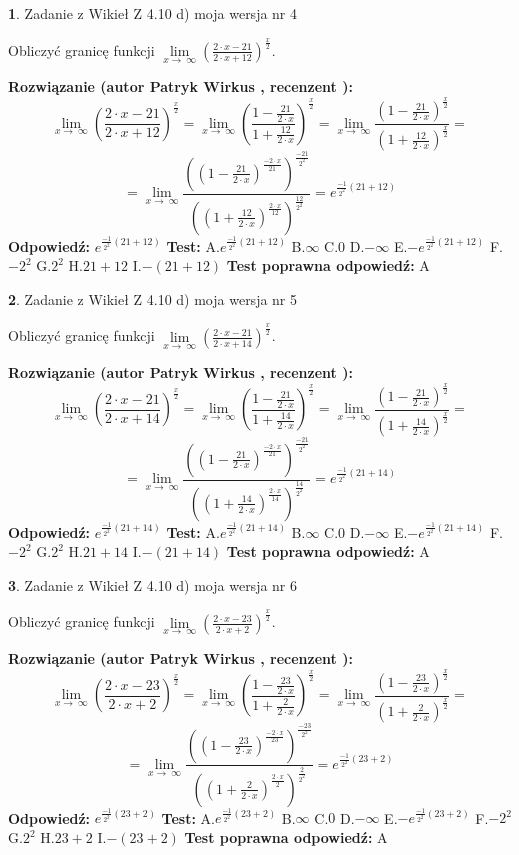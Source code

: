 \documentclass[12pt, a4paper]{article}
\theoremstyle{definition} %
\newtheorem{zad}{}
\newcommand{\zadStart}[1]{\begin{zad}#1\newline}
\newcommand{\zadStop}{\end{zad}}
\newcommand{\rozwStart}[2]{\noindent \textbf{Rozwiązanie (autor #1 , recenzent #2): }\newline}
\newcommand{\rozwStop}{\newline}
\newcommand{\odpStart}{\noindent \textbf{Odpowiedź:}\newline}
\newcommand{\odpStop}{\newline}
\newcommand{\testStart}{\noindent \textbf{Test:}\newline}
\newcommand{\testStop}{\newline}
\newcommand{\kluczStart}{\noindent \textbf{Test poprawna odpowiedź:}\newline}
\newcommand{\kluczStop}{\newline}
\begin{document}
\zadStart{Zadanie z Wikieł Z 4.10 d) moja wersja nr 4}


Obliczyć granicę funkcji  $\lim\limits_{x\to\ \infty}(\frac{2\cdot x-21}{2\cdot x+12})^{\frac{x}{2}}$.
\zadStop
\rozwStart{Patryk Wirkus}{}
$$\lim\limits_{x\to\ \infty}(\frac{2\cdot x-21}{2\cdot x+12})^{\frac{x}{2}} = \lim\limits_{x\to\ \infty}(\frac{1-\frac{21}{2\cdot x}}{1+\frac{12}{2\cdot x}})^{\frac{x}{2}}=\lim\limits_{x\to\ \infty}\frac{(1-\frac{21}{2\cdot x})^{\frac{x}{2}}}{(1+\frac{12}{2\cdot x})^{\frac{x}{2}}}=$$
$$=\lim\limits_{x\to\ \infty}\frac{((1-\frac{21}{2\cdot x})^{\frac{-2\cdot x}{21}})^{\frac{-21}{2^{2}}}}{((1+\frac{12}{2\cdot x})^{\frac{2\cdot x}{12}})^{\frac{12}{2^{2}}}}=e^{\frac{-1}{2^{2}}(21+12)}$$
\rozwStop
\odpStart
$e^{\frac{-1}{2^{2}}(21+12)}$
\odpStop
\testStart
A.$e^{\frac{-1}{2^{2}}(21+12)}$ B.$\infty$ C.$0$ D.$-\infty$ E.$-e^{\frac{-1}{2^{2}}(21+12)}$
F.$-2^{2}$ G.$2^{2}$
H.$21+12$
I.$-(21+12)$
\testStop
\kluczStart
A
\kluczStop



\zadStart{Zadanie z Wikieł Z 4.10 d) moja wersja nr 5}


Obliczyć granicę funkcji  $\lim\limits_{x\to\ \infty}(\frac{2\cdot x-21}{2\cdot x+14})^{\frac{x}{2}}$.
\zadStop
\rozwStart{Patryk Wirkus}{}
$$\lim\limits_{x\to\ \infty}(\frac{2\cdot x-21}{2\cdot x+14})^{\frac{x}{2}} = \lim\limits_{x\to\ \infty}(\frac{1-\frac{21}{2\cdot x}}{1+\frac{14}{2\cdot x}})^{\frac{x}{2}}=\lim\limits_{x\to\ \infty}\frac{(1-\frac{21}{2\cdot x})^{\frac{x}{2}}}{(1+\frac{14}{2\cdot x})^{\frac{x}{2}}}=$$
$$=\lim\limits_{x\to\ \infty}\frac{((1-\frac{21}{2\cdot x})^{\frac{-2\cdot x}{21}})^{\frac{-21}{2^{2}}}}{((1+\frac{14}{2\cdot x})^{\frac{2\cdot x}{14}})^{\frac{14}{2^{2}}}}=e^{\frac{-1}{2^{2}}(21+14)}$$
\rozwStop
\odpStart
$e^{\frac{-1}{2^{2}}(21+14)}$
\odpStop
\testStart
A.$e^{\frac{-1}{2^{2}}(21+14)}$ B.$\infty$ C.$0$ D.$-\infty$ E.$-e^{\frac{-1}{2^{2}}(21+14)}$
F.$-2^{2}$ G.$2^{2}$
H.$21+14$
I.$-(21+14)$
\testStop
\kluczStart
A
\kluczStop



\zadStart{Zadanie z Wikieł Z 4.10 d) moja wersja nr 6}


Obliczyć granicę funkcji  $\lim\limits_{x\to\ \infty}(\frac{2\cdot x-23}{2\cdot x+2})^{\frac{x}{2}}$.
\zadStop
\rozwStart{Patryk Wirkus}{}
$$\lim\limits_{x\to\ \infty}(\frac{2\cdot x-23}{2\cdot x+2})^{\frac{x}{2}} = \lim\limits_{x\to\ \infty}(\frac{1-\frac{23}{2\cdot x}}{1+\frac{2}{2\cdot x}})^{\frac{x}{2}}=\lim\limits_{x\to\ \infty}\frac{(1-\frac{23}{2\cdot x})^{\frac{x}{2}}}{(1+\frac{2}{2\cdot x})^{\frac{x}{2}}}=$$
$$=\lim\limits_{x\to\ \infty}\frac{((1-\frac{23}{2\cdot x})^{\frac{-2\cdot x}{23}})^{\frac{-23}{2^{2}}}}{((1+\frac{2}{2\cdot x})^{\frac{2\cdot x}{2}})^{\frac{2}{2^{2}}}}=e^{\frac{-1}{2^{2}}(23+2)}$$
\rozwStop
\odpStart
$e^{\frac{-1}{2^{2}}(23+2)}$
\odpStop
\testStart
A.$e^{\frac{-1}{2^{2}}(23+2)}$ B.$\infty$ C.$0$ D.$-\infty$ E.$-e^{\frac{-1}{2^{2}}(23+2)}$
F.$-2^{2}$ G.$2^{2}$
H.$23+2$
I.$-(23+2)$
\testStop
\kluczStart
A
\kluczStop
\end{document}
